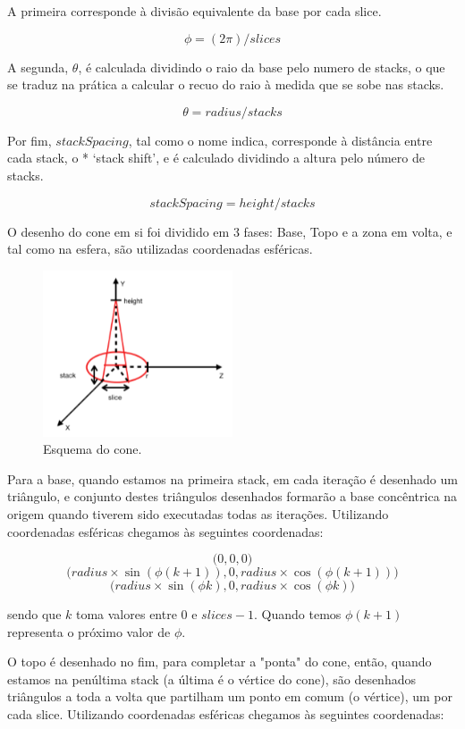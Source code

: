 \documentclass[a4paper]{article}
\newcommand{\x}{\times}
\begin{document}
A primeira corresponde à divisão equivalente da base por cada slice.

\[\phi = (2 \pi) / slices\]

A segunda, $\theta$, é calculada dividindo o raio da base pelo numero de stacks, o que se traduz na prática a calcular o recuo do raio à medida que se sobe nas stacks.

\[\theta = radius / stacks\]

Por fim, $stackSpacing$, tal como o nome indica, corresponde à distância entre cada stack, o *  `stack shift', e é calculado dividindo a altura pelo número de stacks.


\[stackSpacing = height / stacks\]


O desenho do cone em si foi dividido em 3 fases: Base, Topo e a zona em volta, e tal como na esfera, são utilizadas coordenadas esféricas.

\begin{figure}[H]
    \centering
    \includegraphics[width=0.5\textwidth]{coneEsquema.PNG}
    \caption{Esquema do cone.}
\end{figure}

Para a base, quando estamos na primeira stack, em cada iteração é desenhado um triângulo, e conjunto destes triângulos desenhados formarão a base concêntrica na origem quando tiverem sido executadas todas as iterações. Utilizando coordenadas esféricas chegamos às seguintes coordenadas:

 \[\Big(0, 0, 0\Big)\]
 \[\Big(radius \x \sin(\phi (k+1)), 0, radius \x \cos(\phi (k+1))\Big)\]
 \[\Big(radius \x \sin(\phi k), 0, radius \x \cos(\phi k)\Big)\]

sendo que $k$ toma valores entre $0$ e $slices-1$. Quando temos $\phi (k+1)$ representa o próximo valor de $\phi$.

O topo é desenhado no fim, para completar a "ponta" do cone, então, quando estamos na penúltima stack (a última é o vértice do cone), são desenhados triângulos a toda a volta que partilham um ponto em comum (o vértice), um por cada slice. Utilizando coordenadas esféricas chegamos às seguintes coordenadas:
\end{document}
